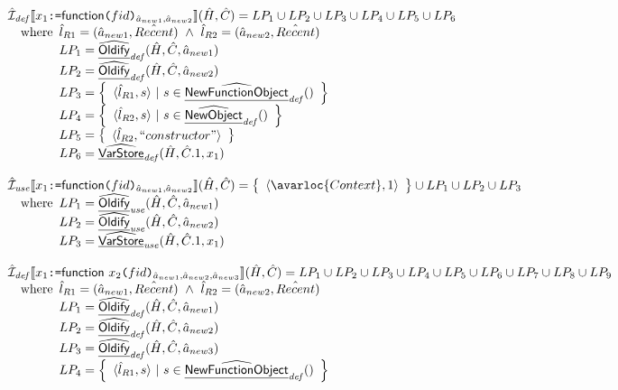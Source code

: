 \[
\begin{array}{l}
  \aI_{\it def}\lbr x_1\TT{:=}\SF{function}\TT{(}fid\TT{)}_{\hat{a}_{new1},\hat{a}_{new2}} \rbr(\hat{H},\hat{C})
  = LP_1 \cup LP_2 \cup LP_3 \cup LP_4 \cup LP_5 \cup LP_6\\
  \quad\wherec{
    \hat{l}_{R1} = (\hat{a}_{new1}, \hat{Recent})\ 
    \land\ \hat{l}_{R2} = (\hat{a}_{new2}, \hat{Recent}) \\
    LP_1 = \ahf{Oldify}_{\it def}(\hat{H}, \hat{C}, \hat{a}_{new1}) \\
    LP_2 = \ahf{Oldify}_{\it def}(\hat{H}, \hat{C}, \hat{a}_{new2}) \\
    LP_3 = \set{\langle \hat{l}_{R1}, s \rangle ~|~ s \in \ahf{NewFunctionObject}_{\it def}() } \\
    LP_4 = \set{\langle \hat{l}_{R2}, s \rangle ~|~ s \in \ahf{NewObject}_{\it def}() } \\
    LP_5 = \set{\langle \hat{l}_{R2}, ``constructor" \rangle} \\
    LP_6 = \ahf{VarStore}_{\it def}(\hat{H},\hat{C}.1,x_1)
  }
  \\\\
  \aI_{\it use}\lbr x_1\TT{:=}\SF{function}\TT{(}fid\TT{)}_{\hat{a}_{new1},\hat{a}_{new2}} \rbr(\hat{H},\hat{C})
  = \set{\langle \avarloc{Context}, 1\rangle} \cup LP_1 \cup LP_2\cup LP_3\\
  \quad\wherec{
    LP_1 = \ahf{Oldify}_{\it use}(\hat{H}, \hat{C}, \hat{a}_{new1}) \\
    LP_2 = \ahf{Oldify}_{\it use}(\hat{H}, \hat{C}, \hat{a}_{new2}) \\
    LP_3 = \ahf{VarStore}_{\it use}(\hat{H},\hat{C}.1,x_1)
  }
  \\\\
  \aI_{\it def}\lbr x_1\TT{:=}\SF{function}~x_2\TT{(}fid\TT{)}_{\hat{a}_{new1},\hat{a}_{new2},\hat{a}_{new3}} \rbr(\hat{H},\hat{C})
  = LP_1 \cup LP_2 \cup LP_3 \cup LP_4 \cup LP_5 \cup LP_6 \cup LP_7 \cup LP_8 \cup LP_9 \\
  \quad\wherec{
    \hat{l}_{R1} = (\hat{a}_{new1}, \hat{Recent})\ 
    \land\ \hat{l}_{R2} = (\hat{a}_{new2}, \hat{Recent}) \\
    LP_1 = \ahf{Oldify}_{\it def}(\hat{H}, \hat{C}, \hat{a}_{new1}) \\
    LP_2 = \ahf{Oldify}_{\it def}(\hat{H}, \hat{C}, \hat{a}_{new2}) \\
    LP_3 = \ahf{Oldify}_{\it def}(\hat{H}, \hat{C}, \hat{a}_{new3}) \\
    LP_4 = \set{\langle \hat{l}_{R1}, s \rangle ~|~ s \in \ahf{NewFunctionObject}_{\it def}() } \\
}
\end{array}\]
